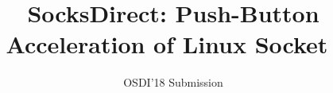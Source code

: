 \documentclass[letterpaper,twocolumn,10pt]{article}
\begin{document}
\title{SocksDirect: Push-Button Acceleration of Linux Socket~\vspace{-0.1in}}

\author{{\rm OSDI'18 Submission}\vspace{-0.5in}}

\newcommand{\authornote}[1]{\raisebox{0.8ex}{$#1$}}
\maketitle

\newcommand{\specialcell}[2][c]{%
  \begin{tabular}[#1]{@{}c@{}}#2\end{tabular}}












\small 
\balance


\end{document}
